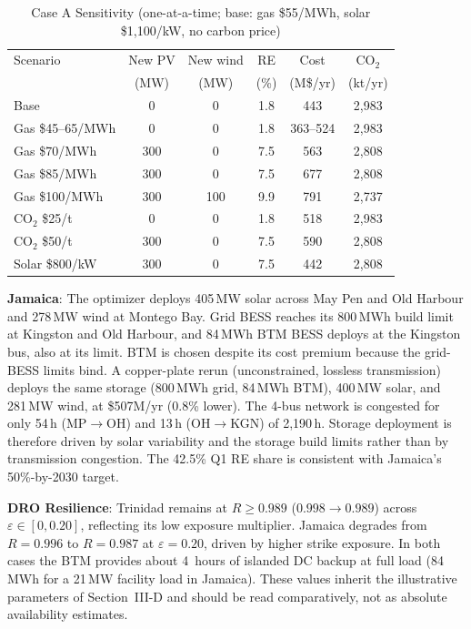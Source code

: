 \documentclass[conference,10pt]{IEEEtran}
\begin{document}
\begin{table}[htbp]
\centering
\caption{Case A Sensitivity (one-at-a-time; base: gas \$55/MWh, solar \$1{,}100/kW, no carbon price)}
\label{tab:sens}
\setlength{\tabcolsep}{3pt}
\begin{tabular}{@{}lccccc@{}}
\toprule
Scenario & New PV & New wind & RE & Cost & CO$_2$ \\
 & (MW) & (MW) & (\%) & (M\$/yr) & (kt/yr) \\
\midrule
Base & 0 & 0 & 1.8 & 443 & 2{,}983 \\
Gas \$45--65/MWh & 0 & 0 & 1.8 & 363--524 & 2{,}983 \\
Gas \$70/MWh & 300 & 0 & 7.5 & 563 & 2{,}808 \\
Gas \$85/MWh & 300 & 0 & 7.5 & 677 & 2{,}808 \\
Gas \$100/MWh & 300 & 100 & 9.9 & 791 & 2{,}737 \\
CO$_2$ \$25/t & 0 & 0 & 1.8 & 518 & 2{,}983 \\
CO$_2$ \$50/t & 300 & 0 & 7.5 & 590 & 2{,}808 \\
Solar \$800/kW & 300 & 0 & 7.5 & 442 & 2{,}808 \\
\bottomrule
\end{tabular}
\end{table}

\textbf{Jamaica}: The optimizer deploys 405\,MW solar across May Pen and Old Harbour and 278\,MW wind at Montego Bay. Grid BESS reaches its 800\,MWh build limit at Kingston and Old Harbour, and 84\,MWh BTM BESS deploys at the Kingston bus, also at its limit. BTM is chosen despite its cost premium because the grid-BESS limits bind. A copper-plate rerun (unconstrained, lossless transmission) deploys the same storage (800\,MWh grid, 84\,MWh BTM), 400\,MW solar, and 281\,MW wind, at \$507M/yr (0.8\% lower). The 4-bus network is congested for only 54\,h (MP$\rightarrow$OH) and 13\,h (OH$\rightarrow$KGN) of 2{,}190\,h. Storage deployment is therefore driven by solar variability and the storage build limits rather than by transmission congestion. The 42.5\% Q1 RE share is consistent with Jamaica's 50\%-by-2030 target.

\textbf{DRO Resilience}: Trinidad remains at $R \geq 0.989$ ($0.998\rightarrow0.989$) across $\varepsilon\in[0,0.20]$, reflecting its low exposure multiplier. Jamaica degrades from $R = 0.996$ to $R = 0.987$ at $\varepsilon = 0.20$, driven by higher strike exposure. In both cases the BTM provides about 4~hours of islanded DC backup at full load (84\,MWh for a 21\,MW facility load in Jamaica). These values inherit the illustrative parameters of Section~III-D and should be read comparatively, not as absolute availability estimates.
\end{document}
